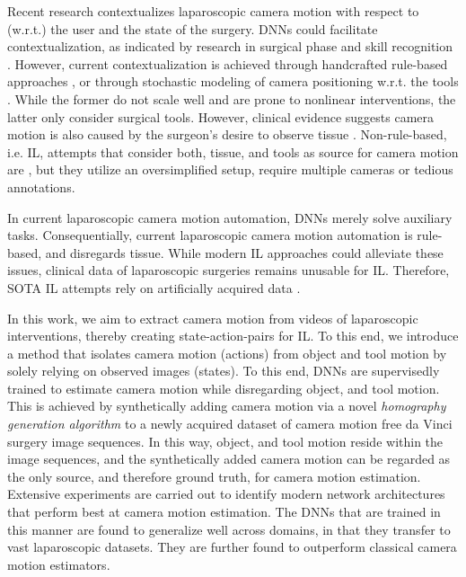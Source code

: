 Recent research contextualizes laparoscopic camera motion with respect to (w.r.t.) the user and the state of the surgery. DNNs could facilitate contextualization, as indicated by research in surgical phase and skill recognition \cite{kitaguchi2020real}. However, current contextualization is achieved through handcrafted rule-based approaches \cite{rivas2014towards, rivas2017smart}, or through stochastic modeling of camera positioning w.r.t. the tools \cite{weede2011intelligent, rivas2019transferring}. While the former do not scale well and are prone to nonlinear interventions, the latter only consider surgical tools. However, clinical evidence suggests camera motion is also caused by the surgeon's desire to observe tissue \cite{ellis2016task}. Non-rule-based, i.e. IL, attempts that consider both, tissue, and tools as source for camera motion are \cite{ji2018learning, su2020multicamera, wagner2021learning}, but they utilize an oversimplified setup, require multiple cameras or tedious annotations.

In current laparoscopic camera motion automation, DNNs merely solve auxiliary tasks. Consequentially, current laparoscopic camera motion automation is rule-based, and disregards tissue. While modern IL approaches could alleviate these issues, clinical data of laparoscopic surgeries remains unusable for IL. Therefore, SOTA IL attempts rely on artificially acquired data \cite{ji2018learning, su2020multicamera, wagner2021learning}. 

In this work, we aim to extract camera motion from videos of laparoscopic interventions, thereby creating state-action-pairs for IL. To this end, we introduce a method that isolates camera motion (actions) from object and tool motion by solely relying on observed images (states). To this end, DNNs are supervisedly trained to estimate camera motion while disregarding object, and tool motion. This is achieved by synthetically adding camera motion via a novel \textit{homography generation algorithm} to a newly acquired dataset of camera motion free da Vinci surgery image sequences. In this way, object, and tool motion reside within the image sequences, and the synthetically added camera motion can be regarded as the only source, and therefore ground truth, for camera motion estimation. Extensive experiments are carried out to identify modern network architectures that perform best at camera motion estimation. The DNNs that are trained in this manner are found to generalize well across domains, in that they transfer to vast laparoscopic datasets. They are further found to outperform classical camera motion estimators.

